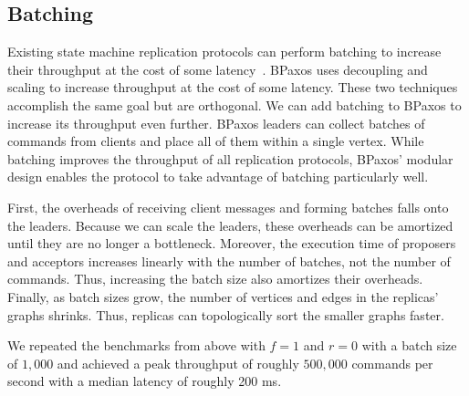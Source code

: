 \subsection{Batching}
Existing state machine replication protocols can perform batching to increase
their throughput at the cost of some latency~\cite{santos2012tuning,
santos2013optimizing, moraru2013proof}. BPaxos uses decoupling and scaling to
increase throughput at the cost of some latency. These two techniques
accomplish the same goal but are orthogonal. We can add batching to BPaxos to
increase its throughput even further. BPaxos leaders can collect batches of
commands from clients and place all of them within a single vertex. While
batching improves the throughput of all replication protocols, BPaxos' modular
design enables the protocol to take advantage of batching particularly well.

First, the overheads of receiving client messages and forming batches falls
onto the leaders. Because we can scale the leaders, these overheads can be
amortized until they are no longer a bottleneck. Moreover, the execution time
of proposers and acceptors increases linearly with the number of batches, not
the number of commands. Thus, increasing the batch size also amortizes their
overheads. Finally, as batch sizes grow, the number of vertices and edges in
the replicas' graphs shrinks. Thus, replicas can topologically sort the smaller
graphs faster.

We repeated the benchmarks from above with $f=1$ and $r=0$ with a batch size of
$1,000$ and achieved a peak throughput of roughly $500,000$ commands per second
with a median latency of roughly 200 ms.
